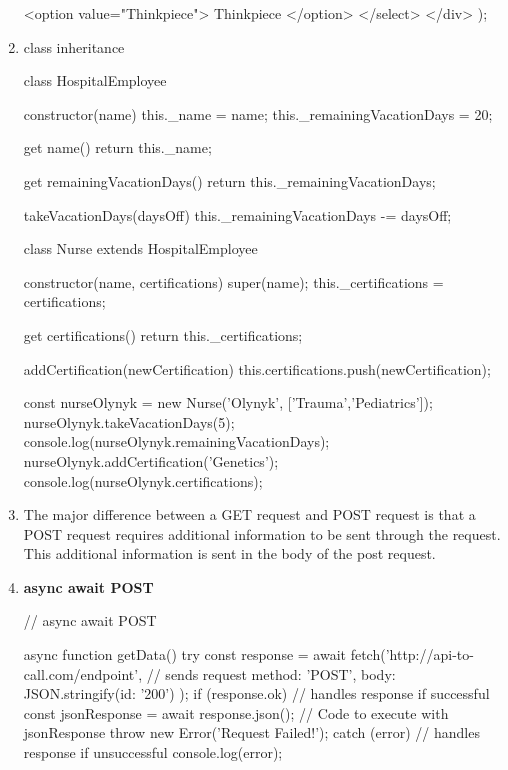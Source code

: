 \documentclass[a4paper,12pt]{article}
\begin{document}
\begin{enumerate}
\begin{jscode}
{{          <option value="Thinkpiece">
            Thinkpiece
          </option>
        </select>
      </div>
    );
  }
}
\end{jscode}


\item class inheritance
\begin{jscode}
class HospitalEmployee {
  constructor(name) {
    this._name = name;
    this._remainingVacationDays = 20;
  }
  
  get name() {
    return this._name;
  }
  
  get remainingVacationDays() {
    return this._remainingVacationDays;
  }
  
  takeVacationDays(daysOff) {
    this._remainingVacationDays -= daysOff;
  }
}

class Nurse extends HospitalEmployee {
  constructor(name, certifications) {
    super(name);
    this._certifications = certifications;
  }  
  
  get certifications() {
    return this._certifications;
  }
  
  addCertification(newCertification) {
    this.certifications.push(newCertification);
  }
}

const nurseOlynyk = new Nurse('Olynyk', ['Trauma','Pediatrics']);
nurseOlynyk.takeVacationDays(5);
console.log(nurseOlynyk.remainingVacationDays);
nurseOlynyk.addCertification('Genetics');
console.log(nurseOlynyk.certifications);
\end{jscode}

\item The major difference between a GET request and POST request is that a POST request requires additional information to be sent through the request. This additional information is sent in the body of the post request.

\item \textbf{async await POST}
\begin{jscode}
// async await POST

async function getData(){
  try {
    const response = await fetch('http://api-to-call.com/endpoint', { // sends request
      method: 'POST',
      body: JSON.stringify({id: '200'})
    });
    if (response.ok){ // handles response if successful
      const jsonResponse = await response.json();
      // Code to execute with jsonResponse
    }
    throw new Error('Request Failed!');
  } catch (error){ // handles response if unsuccessful
    console.log(error);
  }
}
\end{jscode}


\end{enumerate}
\end{document}
